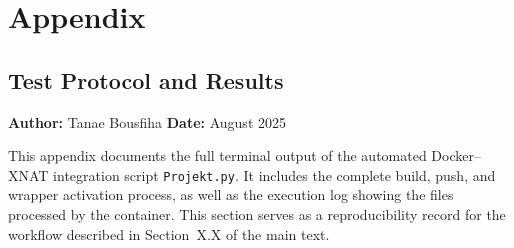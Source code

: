 
    


\appendix
\chapter{Appendix}
\section{Test Protocol and Results}

\label{app:test}

\noindent\textbf{Author:} Tanae Bousfiha  
\noindent\textbf{Date:} August 2025  

\noindent This appendix documents the full terminal output of the automated Docker–XNAT integration script
\texttt{Projekt.py}.  
It includes the complete build, push, and wrapper activation process, as well as the execution log showing the files processed by the container.  
This section serves as a reproducibility record for the workflow described in Section~X.X of the main text.














